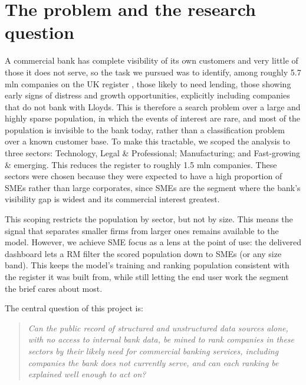 \documentclass[    author={Samuel Menon Demelo; Sneha Saphala Ram Prasad; 
Viktor Ander Lindholm; Vishal Khatri},
               supervisor={Prof. Fernando Moreno-Pino},
                   degree={MSc},
                    title={Lloyds Commercial Banking Intelligence},
                 subtitle={Ranking SME Lending, Risk and Growth Prospects for Lloyds Banking Group},
                     type={},
                     year={2026}]{dissertation}
\begin{document}
\section{The problem and the research question}
\label{sec:problem}
A commercial bank has complete visibility of its own customers and very little of those it does not serve, so the task we pursued was to identify, among roughly 5.7 mln companies on the UK register \cite{companieshouse_api}, those likely to need lending, those showing early signs of distress and growth opportunities, explicitly including companies that do not bank with Lloyds. This is therefore a search problem over a large and highly sparse population, in which the events of interest are rare, and most of the population is invisible to the bank today, rather than a classification problem over a known customer base. To make this tractable, we scoped the analysis to three sectors: Technology, Legal \& Professional; Manufacturing; and Fast-growing \& emerging. This reduces the register to roughly 1.5 mln companies. These sectors were chosen because they were expected to have a high proportion of SMEs rather than large corporates, since SMEs are the segment where the bank's visibility gap is widest and its commercial interest greatest. 

This scoping restricts the population by sector, but not by size. This means the signal that separates smaller firms from larger ones remains available to the model. However, we achieve SME focus as a lens at the point of use: the delivered dashboard lets a RM filter the scored population down to SMEs (or any size band). This keeps the model's training and ranking population consistent with the register it was built from, while still letting the end user work the segment the brief cares about most.

The central question of this project is:
\begin{quote}
\itshape
Can the public record of structured and unstructured data sources alone, with no access to internal bank data, be mined to rank companies in these sectors by their likely need for commercial banking services, including companies the bank does not currently serve, and can each ranking be explained well enough to act on?
\end{quote}
\end{document}
